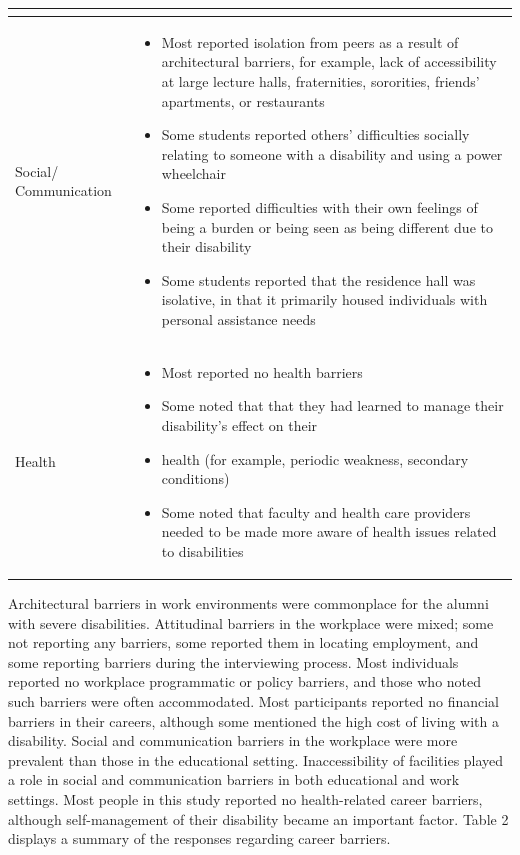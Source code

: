 \documentclass[11.5pt]{sig-alternate} %
\begin{document}
\begin{large}
\begin{table}[t]
\begin{tabular}{|l|l|}
\begin{itemize}[noitemsep, topsep=0pt, leftmargin=*]
\end{itemize} \\ \hline
Social/ Communication & 
\begin{itemize}[noitemsep, topsep=0pt, leftmargin=*]
\item Most reported isolation from peers as a result of architectural barriers, for example, lack of accessibility at large lecture halls, fraternities, sororities, friends' apartments, or restaurants
\item Some students reported others' difficulties socially relating to someone with a disability and using a power wheelchair
\item Some reported difficulties with their own feelings of being a burden or being seen as being different due to their disability
\item Some students reported that the residence hall was isolative, in that it primarily housed individuals with personal assistance needs
\end{itemize} \\ \hline
Health & 
\begin{itemize}[noitemsep, topsep=0pt, leftmargin=*]
\item Most reported no health barriers
\item Some noted that that they had learned to manage their disability's effect on their
\item health (for example, periodic weakness, secondary conditions)
\item Some noted that faculty and health care providers needed to be made more aware of health issues related to disabilities
\end{itemize} \\ \hline
\end{tabular}
\end{table}

Architectural barriers in work environments were commonplace for the alumni with severe disabilities. Attitudinal barriers in the workplace were mixed; some not reporting any barriers, some reported them in locating employment, and some reporting barriers during the interviewing process. Most individuals reported no workplace programmatic or policy barriers, and those who noted such barriers were often accommodated. Most participants reported no financial barriers in their careers, although some mentioned the high cost of living with a disability. Social and communication barriers in the workplace were more prevalent than those in the educational setting. Inaccessibility of facilities played a role in social and communication barriers in both educational and work settings. Most people in this study reported no health-related career barriers, although self-management of their disability became an important factor. Table 2 displays a summary of the responses regarding career barriers.


\end{large}
\end{document}
